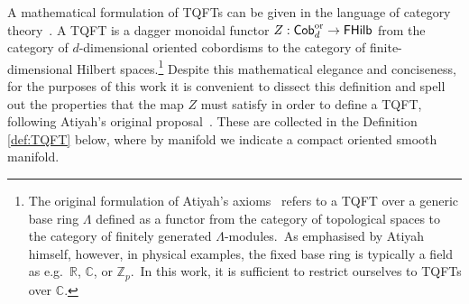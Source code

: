 \documentclass[11pt]{article}
\theoremstyle{definition}
\numberwithin{equation}{section}
\begin{document}
A mathematical formulation of TQFTs can be given in the language of category theory~\cite{Baez_Dolan_1995,Bakalov_Kirillov_2001}. A TQFT is a dagger monoidal functor $Z:\mathsf{Cob}_d^{\rm {or}}\to\mathsf{FHilb}$ from the category of $d$-dimensional oriented cobordisms to the category of finite-dimensional Hilbert spaces.\footnote{The original formulation of Atiyah's axioms~\cite{Atiyah_1988} refers to a TQFT over a generic base ring $\Lambda$ defined as a functor from the category of topological spaces to the category of finitely generated $\Lambda$-modules.~As emphasised by Atiyah himself, however, in physical examples, the fixed base ring is typically a field as e.g.~$\mathbb R$, $\mathbb C$, or $\mathbb Z_p$.~In this work, it is sufficient to restrict ourselves to TQFTs over $\mathbb C$.} Despite this mathematical elegance and conciseness, for the purposes of this work it is convenient to dissect this definition and spell out the properties that the map $Z$ must satisfy in order to define a TQFT, following Atiyah's original proposal~\cite{Atiyah_1988}. These are collected in the Definition \ref{def:TQFT} below, where by manifold we indicate a compact oriented smooth manifold.
\end{document}

